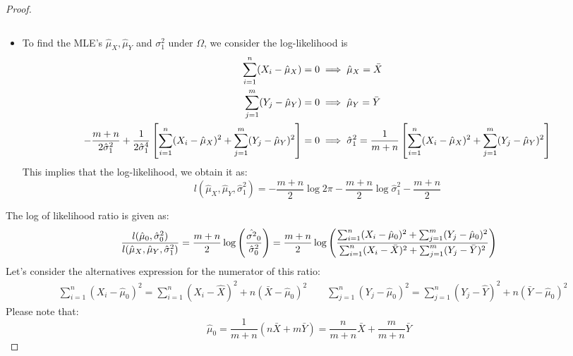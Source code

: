 \begin{proof}
\begin{itemize}
\begin{equation*}
        \end{equation*}
        \item To find the MLE's $\hat{\mu}_X, \hat{\mu}_Y$ and $\sigma^2_1$ under $\Omega$, we consider the log-likelihood is
        \begin{equation*}
        \begin{aligned}
            \sum^n_{i=1}(X_i - \hat{\mu}_X) = 0& \implies \hat{\mu}_X = \bar{X} \\
            \sum^m_{j=1}(Y_j - \hat{\mu}_Y) = 0& \implies \hat{\mu}_Y = \bar{Y} \\
            -\frac{m+n}{2\hat{\sigma}^2_1} + \frac{1}{2\hat{\sigma}^4_1}\left[ \sum^n_{i=1}(X_i - \hat{\mu}_X)^2 + \sum^m_{j=1}(Y_j - \hat{\mu}_Y)^2 \right] = 0&  \implies \hat{\sigma}^2_1 = \frac{1}{m+n}\left[ \sum^n_{i=1}(X_i-\hat{\mu}_X)^2 + \sum^m_{j=1}(Y_j - \hat{\mu}_Y)^2 \right]
        \end{aligned}
        \end{equation*}
        This implies that the log-likelihood, we obtain it as:
        \begin{equation*}
            l(\hat{\mu}_X, \hat{\mu}_Y , \hat{\sigma}^2_1) = -\frac{m+n}{2} \log 2\pi - \frac{m+n}{2}\log\hat{\sigma}^2_1 - \frac{m+n}{2}
        \end{equation*}
    \end{itemize}
    The log of likelihood ratio is given as:
    \begin{equation*}
        \frac{l(\hat{\mu}_0, \hat{\sigma}^2_0)}{l(\hat{\mu}_X, \hat{\mu}_Y , \hat{\sigma}^2_1)} = \frac{m+n}{2}\log\left( \frac{\hat{\sigma^2}_0}{\hat{\sigma}^2_0} \right) = \frac{m+n}{2}\log\left( \frac{\sum^n_{i=1}(X_i - \hat{\mu}_0)^2 + \sum^m_{j=1}(Y_j-\hat{\mu}_0)^2}{ \sum^n_{i=1}(X_i - \bar{X})^2 + \sum^m_{j=1}(Y_j-\bar{Y})^2 } \right) 
    \end{equation*}
    Let's consider the alternatives expression for the numerator of this ratio:
    \begin{equation*}
    \begin{aligned}
        &\sum^n_{i=1}(X_i - \hat{\mu}_0)^2 = \sum^n_{i=1}(X_i - \hat{X})^2 + n(\bar{X} - \hat{\mu}_0)^2 
        \qquad \sum^n_{j=1}(Y_j - \hat{\mu}_0)^2 = \sum^n_{j=1}(Y_j - \hat{Y})^2 + n(\bar{Y} - \hat{\mu}_0)^2
    \end{aligned}
    \end{equation*}
    Please note that:
    \begin{equation*}
        \hat{\mu}_0 = \frac{1}{m+n}(n\bar{X} + m\bar{Y}) = \frac{n}{m+n}\bar{X} + \frac{m}{m+n}\bar{Y}

\end{equation*}
\end{proof}
